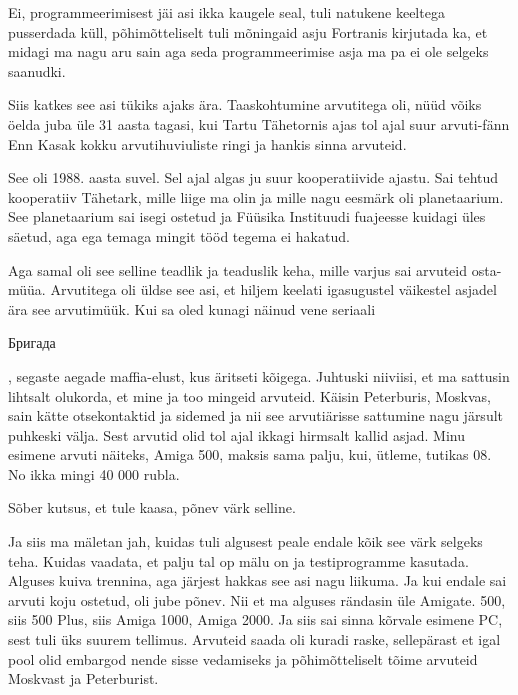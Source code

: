 Ei, programmeerimisest jäi asi ikka kaugele seal, tuli natukene keeltega pusserdada küll,  põhimõtteliselt tuli mõningaid asju Fortranis kirjutada ka, et midagi ma nagu aru sain aga seda programmeerimise asja ma pa ei ole selgeks saanudki. 

Siis katkes see asi tükiks ajaks ära. Taaskohtumine arvutitega oli, nüüd võiks öelda juba üle 31 aasta tagasi, kui Tartu Tähetornis ajas tol ajal suur arvuti-fänn Enn Kasak kokku arvutihuviuliste ringi ja hankis sinna arvuteid.


See oli 1988. aasta suvel. Sel ajal algas ju suur kooperatiivide ajastu. Sai tehtud kooperatiiv Tähetark, mille liige ma olin ja mille nagu eesmärk oli planetaarium. See planetaarium sai isegi ostetud ja  Füüsika Instituudi fuajeesse kuidagi üles säetud, aga ega temaga mingit tööd tegema ei hakatud. 

Aga samal oli see selline teadlik ja teaduslik keha,  mille varjus sai arvuteid osta-müüa. Arvutitega oli üldse see asi, et hiljem keelati igasugustel väikestel asjadel ära see arvutimüük. Kui sa oled kunagi näinud vene seriaali \begin{russian}Бригада\end{russian}, segaste aegade maffia-elust, kus äritseti kõigega. Juhtuski niiviisi, et ma sattusin lihtsalt olukorda, et mine ja too mingeid arvuteid. Käisin Peterburis, Moskvas, sain kätte otsekontaktid ja sidemed ja nii see arvutiärisse sattumine nagu järsult puhkeski välja. Sest arvutid olid tol ajal ikkagi hirmsalt kallid asjad. Minu esimene arvuti näiteks, Amiga 500,  maksis sama palju, kui, ütleme, tutikas 08. No ikka mingi 40 000 rubla.
                 

Sõber kutsus, et tule kaasa, põnev värk selline.

Ja siis ma mäletan jah, kuidas tuli algusest peale endale kõik see värk selgeks teha. Kuidas vaadata, et palju tal op mälu on ja testiprogramme kasutada. Alguses kuiva trennina, aga järjest hakkas see asi nagu liikuma. Ja kui endale sai arvuti koju ostetud,  oli jube põnev. Nii et ma alguses rändasin  üle Amigate.  500, siis 500 Plus, siis Amiga 1000, Amiga 2000. Ja siis sai sinna kõrvale esimene PC, sest tuli üks suurem tellimus. Arvuteid saada oli kuradi raske, sellepärast et igal pool olid embargod nende sisse vedamiseks ja  põhimõtteliselt tõime arvuteid Moskvast ja Peterburist.\label{sisu!veiko_moskvas}

